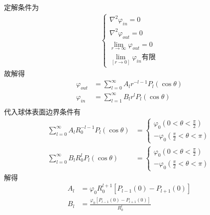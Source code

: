 \documentclass{phyasgn}
\begin{document}
\begin{sol}[7]
  定解条件为
  \begin{align*}
    \left\{\begin{matrix}
      \nabla^2\varphi_{in}=0\\
      \nabla^2\varphi_{out}=0\\
      \lim_{r\to\infty}\varphi_{out}=0\\
      \lim_[r\to0]\varphi_{in}\text{有限}
    \end{matrix}\right.
  \end{align*}
  故解得
  \begin{align*}
    \varphi_{out}&=\sum_{l=0}^{\infty}A_lr^{-l-1}P_l(\cos\theta)\\
    \varphi_{in}&=\sum_{l=1}^{\infty}B_lr^{l}P_l(\cos\theta)\\
  \end{align*}
  代入球体表面边界条件有
  \begin{align*}
    \sum_{l=0}^{\infty}A_lR_0^{-l-1}P_l(\cos\theta)&=\left\{\begin{matrix}
      \varphi_0(0<\theta<\frac{\pi}{2})\\
      -\varphi_0(\frac{\pi}{2}<\theta<\pi)
    \end{matrix}\right.\\
    \sum_{l=0}^{\infty}B_lR_0^{l}P_l(\cos\theta)&=\left\{\begin{matrix}
      \varphi_0(0<\theta<\frac{\pi}{2})\\
      -\varphi_0(\frac{\pi}{2}<\theta<\pi)
    \end{matrix}\right.
  \end{align*}
  解得
  \begin{align*}
    A_l&=\varphi_0R_0^{l+1}[P_{l-1}(0)-P_{l+1}(0)]\\
    B_l&=\frac{\varphi_0[P_{l-1}(0)-P_{l+1}(0)]}{R_0^l}
  \end{align*}
\end{sol}
\end{document}
